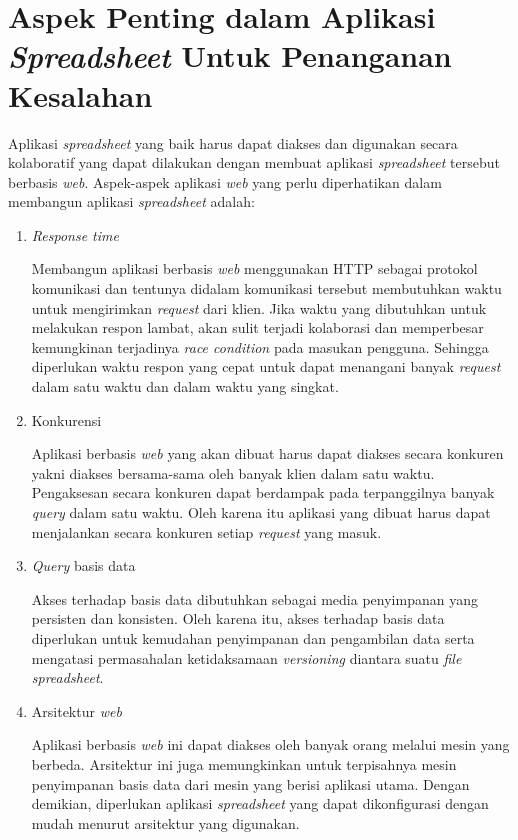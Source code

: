 \section{Aspek Penting dalam Aplikasi \textit{Spreadsheet} Untuk Penanganan Kesalahan}
Aplikasi \textit{spreadsheet} yang baik harus dapat diakses dan digunakan secara kolaboratif yang dapat dilakukan dengan membuat aplikasi \textit{spreadsheet} tersebut berbasis \textit{web}. Aspek-aspek aplikasi \textit{web} yang perlu diperhatikan dalam membangun aplikasi \textit{spreadsheet} adalah:
\begin{enumerate}
	\item \textit{Response time}

	Membangun aplikasi berbasis \textit{web} menggunakan HTTP sebagai protokol komunikasi dan tentunya didalam komunikasi tersebut membutuhkan waktu untuk mengirimkan \textit{request} dari klien. Jika waktu yang dibutuhkan untuk melakukan respon lambat, akan sulit terjadi kolaborasi dan memperbesar kemungkinan terjadinya \textit{race condition} pada masukan pengguna. Sehingga diperlukan waktu respon yang cepat untuk dapat menangani banyak \textit{request} dalam satu waktu dan dalam waktu yang singkat.

	\item Konkurensi

	Aplikasi berbasis \textit{web} yang akan dibuat harus dapat diakses secara konkuren yakni diakses bersama-sama oleh banyak klien dalam satu waktu. Pengaksesan secara konkuren dapat berdampak pada terpanggilnya banyak \textit{query} dalam satu waktu. Oleh karena itu aplikasi yang dibuat harus dapat menjalankan secara konkuren setiap \textit{request} yang masuk.

	\item \textit{Query} basis data

	Akses terhadap basis data dibutuhkan sebagai media penyimpanan yang persisten dan konsisten. Oleh karena itu, akses terhadap basis data diperlukan untuk kemudahan penyimpanan dan pengambilan data serta mengatasi permasahalan ketidaksamaan \textit{versioning} diantara suatu \textit{file spreadsheet}.

	\item Arsitektur \textit{web}

	Aplikasi berbasis \textit{web} ini dapat diakses oleh banyak orang melalui mesin yang berbeda. Arsitektur ini juga memungkinkan untuk terpisahnya mesin penyimpanan basis data dari mesin yang berisi aplikasi utama. Dengan demikian, diperlukan aplikasi \textit{spreadsheet} yang dapat dikonfigurasi dengan mudah menurut arsitektur yang digunakan.
\end{enumerate}


